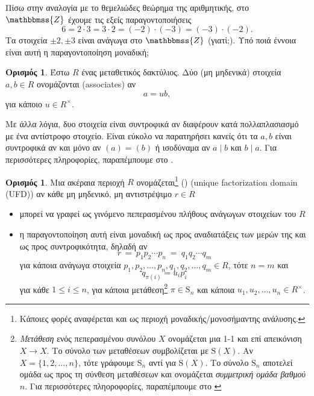 \documentclass[12pt,a4paper,reqno]{amsart}
\theoremstyle{definition}
\newtheorem{definition}[theorem]{Ορισμός}
\theoremstyle{remark}
\numberwithin{theorem}{section}
\numberwithin{exercise}{section}
\numberwithin{equation}{section}
\newcommand{\ZZ}{\mathbbmss{Z}}
\newcommand{\rmS}{\mathrm{S}}
\renewcommand{\to}{\rightarrow}
\newcommand{\defn}[1]{{\color{mylightblue}{#1}}}
\begin{document}
Πίσω στην αναλογία με το θεμελιώδες θεώρημα της αριθμητικής, στο $\ZZ$ έχουμε τις εξείς παραγοντοποιήσεις 
\[
6 = 2 \cdot 3 = 3 \cdot 2 = (-2)\cdot(-3) = (-3)\cdot(-2).
\]
Τα στοιχεία $\pm2, \pm3$ είναι ανάγωγα στο $\ZZ$ (γιατί;). Υπό ποιά έννοια είναι αυτή η παραγοντο\-ποίηση μοναδική;
\begin{definition}
    \label{def:associate}
    Έστω $R$ ένας μεταθετικός δακτύλιος. Δύο (μη μηδενικά) στοιχεία $a, b \in R$ ονομάζονται \defn{συντροφικά} (associates) αν 
    \[
    a = ub,
    \]
    για κάποιο $u \in R^\times$.
\end{definition}

Με άλλα λόγια, δυο στοιχεία είναι συντροφικά αν διαφέρουν κατά πολλαπλασιασμό με ένα αντίστροφο στοιχείο. Είναι εύκολο να παρατηρήσει κανείς ότι τα $a, b$ είναι συντροφικά αν και μόνο αν $(a) = (b)$ ή ισοδύναμα αν $a \mid b$ και $b \mid a$. Για περισσότερες πληροφορίες, παραπέμπουμε στο \cite[Ενότητα 11.2]{Mpe15}. 

\begin{definition}
    \label{def:UFD}
    Μια ακέραια περιοχή $R$ ονομάζεται\footnote{Κάποιες φορές αναφέρεται και ως περιοχή μοναδικής/μονοσήμαντης ανάλυσης.} \defn{περιοχή μονοσήμαντης παραγοντο\-ποίησης} (\defn{ΠΜΠ}) (unique factorization domain (UFD)) αν κάθε μη μηδενικό, μη αντιστρέψιμο $r \in R$
    \begin{itemize}
        \item[(1)] μπορεί να γραφεί ως γινόμενο πεπερασμένου πλήθους ανάγωγων στοιχείων του $R$
        \item[(2)] η παραγοντοποίηση αυτή είναι μοναδική ως προς αναδιατάξεις των μερών της και ως προς συντροφικότητα, δηλαδή αν 
        \[
        r \ = \ p_1p_2\cdots p_n \ = \ q_1q_2 \cdots q_m 
        \]
        για κάποια ανάγωγα στοιχεία $p_1, p_2, \dots, p_n, q_1, q_2, \dots, q_m \in R$, τότε $n = m$ και 
        \[
        q_{\pi(i)} = u_ip_i
        \]
        για κάθε $1 \le i \le n$, για κάποια μετάθεση\footnote{\emph{Μετάθεση} ενός πεπερασμένου συνόλου $X$ ονομάζεται μια 1-1 και επί απεικόνιση $X \to X$. Το σύνολο των μεταθέσεων συμβολίζεται με $\rmS(X)$. Αν $X = \{1, 2, \dots, n\}$, τότε γράφουμε $\rmS_n$ αντί για $\rmS(X)$. Το σύνολο $\rmS_n$ αποτελεί ομάδα ως προς τη σύνθεση μεταθέσεων και ονομάζεται \emph{συμμετρική ομάδα βαθμού $n$}. Για περισσότερες πληοροφορίες, παραπέμπουμε στο \cite[Ενότητα~1.3]{DF04}} $\pi \in \rmS_n$ και κάποια $u_1, u_2, \dots, u_n \in R^\times$.
    \end{itemize}
\end{definition}
\end{document}
